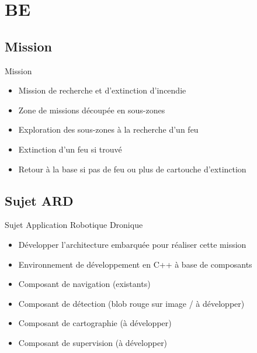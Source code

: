 \documentclass[compress]{beamer}
\begin{document}
\section{BE}
\begin{frame}
\tableofcontents[hideothersubsections]
\end{frame}

\subsection{Mission}
\begin{frame}{Mission}
\begin{itemize}
\item Mission de recherche et d'extinction d'incendie
\item Zone de missions découpée en sous-zones
\item Exploration des sous-zones à la recherche d'un feu
\item Extinction d'un feu si trouvé
\item Retour à la base si pas de feu ou plus de cartouche d'extinction
\end{itemize}
\end{frame}

\subsection{Sujet ARD}
\begin{frame}{Sujet Application Robotique Dronique}
\begin{itemize}
\item Développer l'architecture embarquée pour réaliser cette mission
\item Environnement de développement en C++ à base de composants
\item Composant de navigation (existants)
\item Composant de détection (blob rouge sur image / à développer)
\item Composant de cartographie (à développer)
\item Composant de supervision (à développer)
\end{itemize}
\end{frame}
\end{document}
